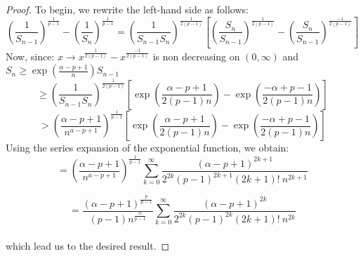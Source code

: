 \documentclass[11pt]{amsart}
\newcommand{\1}{[1]}
\begin{document}
\begin{proof} To begin, we rewrite the left-hand side as follows:
$$
\left( \frac{1}{S_{n-1}} \right)^{\frac{1}{p-1}}- \left( \frac{1}{S_{n}} \right)^{\frac{1}{p-1}} = \left( \frac{1}{S_{n-1} S_{n}} \right)^{\frac{1}{2(p-1)}} \left[\left( \frac{S_{n}}{S_{n-1}} \right)^{\frac{1}{2(p-1)}}- \left( \frac{S_{n}}{S_{n-1}} \right)^{\frac{-1}{2(p-1)}}\right]
$$
Now, since: $x \to x^{\frac{1}{2(p-1)}} - x^{\frac{-1}{2(p-1)}}$ is non decreasing on $(0,\infty)$ and $S_{n} \geq  \exp(\frac{\alpha-p+1}{n}) S_{n-1}$
$$
\geq  \left( \frac{1}{S_{n-1} S_{n}} \right)^{\frac{1}{2(p-1)}} \left[ \exp\left( \frac{\alpha-p+1} {2(p-1)n} \right)- \exp\left( \frac{-\alpha+p-1} {2(p-1)n} \right) \right]
$$
$$
 > \left(\frac{\alpha -p+1}{n^{a-p+1}} \right)^{\frac{1}{p-1}} \left[ \exp\left( \frac{\alpha-p+1} {2(p-1)n} \right)- \exp\left( \frac{-\alpha+p-1} {2(p-1)n} \right) \right]
$$
Using the series expansion of the exponential function, we obtain:
$$
=  \left(\frac{\alpha -p+1}{n^{a-p+1}} \right)^{\frac{1}{p-1}}  \sum_{k=0}^{\infty} \frac{(\alpha-p+1)^{2k+1}}{2^{2k}(p-1)^{2k+1} (2k+1)!  \ n^{2k+1}}
$$

$$ = \frac{(\alpha-p+1)^{\frac{p}{p-1}}}{(p-1) n^{\frac{\alpha}{p-1}}} 
\sum_{k=0}^{\infty} \frac{(\alpha-p+1)^{2k}}{2^{2k}(p-1)^{2k} (2k+1)!  \ n^{2k}}
$$
\phantom{.} \\
which lead us to the desired result.
\end{proof}
\end{document}

